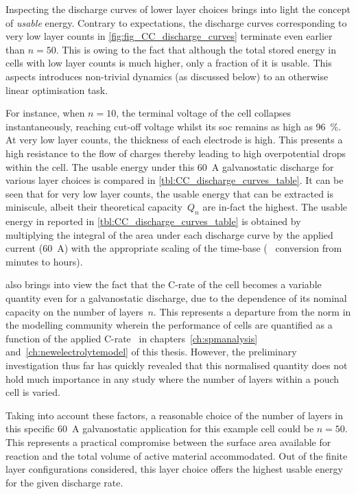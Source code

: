 Inspecting the  discharge curves of  lower layer  choices brings into  light the
concept of \emph{usable} energy. Contrary  to expectations, the discharge curves
corresponding  to very  low layer  counts in  \cref{fig:fig_CC_discharge_curves}
terminate even earlier than $n=50$. This is  owing to the fact that although the
total  stored energy  in cells  with low  layer counts  is much  higher, only  a
fraction  of it  is usable.  This  aspects introduces  non-trivial dynamics  (as
discussed below) to an otherwise linear optimisation task.

For  instance,  when $n  =  10$,  the terminal  voltage  of  the cell  collapses
instantaneously, reaching cut-off  voltage whilst its \gls{soc}  remains as high
as \SI{96}{\percent}. At very low layer  counts, the thickness of each electrode
is high. This presents a high resistance  to the flow of charges thereby leading
to  high overpotential  drops  within the  cell. The  usable  energy under  this
\SI{60}{\ampere} galvanostatic  discharge for various layer  choices is compared
in \cref{tbl:CC_discharge_curves_table}. It can be  seen that for very low layer
counts,  the usable  energy that  can be  extracted is  miniscule, albeit  their
theoretical  capacity~$Q_n$  are  in-fact  the highest.  The  usable  energy  in
\SI{}{\watthour} reported in \cref{tbl:CC_discharge_curves_table} is obtained by
multiplying the integral  of the area under each discharge  curve by the applied
current (\SI{60}{\ampere}) with  the appropriate scaling of  the time-base (\ie~
conversion from minutes to hours).



  also brings  into view  the fact  that the
\mbox{C-rate} of the  cell becomes a variable quantity even  for a galvanostatic
discharge,  due to  the dependence  of  its nominal  capacity on  the number  of
layers~$n$. This represents a departure from the norm in the modelling community
wherein the  performance of cells  are quantified as  a function of  the applied
C-rate  \eg~in  chapters~\ref{ch:spmanalysis} and~\ref{ch:newelectrolytemodel}
of  this thesis.  However, the  preliminary investigation  thus far  has quickly
revealed that  this normalised  quantity does  not hold  much importance  in any
study where the number of layers within a pouch cell is varied.

Taking into account  these factors, a reasonable choice of  the number of layers
in  this specific  \SI{60}{\ampere} galvanostatic  application for  this example
cell  could  be $n=50$.  This  represents  a  practical compromise  between  the
surface area  available for  reaction and  the total  volume of  active material
accommodated.  Out of  the finite  layer configurations  considered, this  layer
choice offers the highest usable energy for the given discharge rate.

